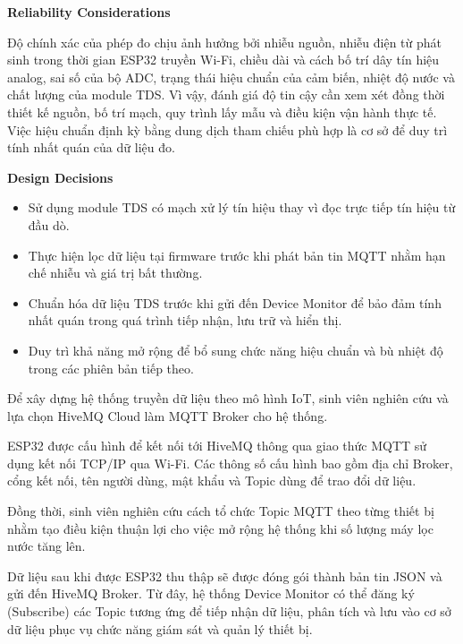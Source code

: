 \textbf{Reliability Considerations}

Độ chính xác của phép đo chịu ảnh hưởng bởi nhiễu nguồn, nhiễu điện từ phát sinh trong thời gian ESP32 truyền Wi-Fi, chiều dài và cách bố trí dây tín hiệu analog, sai số của bộ ADC, trạng thái hiệu chuẩn của cảm biến, nhiệt độ nước và chất lượng của module TDS. Vì vậy, đánh giá độ tin cậy cần xem xét đồng thời thiết kế nguồn, bố trí mạch, quy trình lấy mẫu và điều kiện vận hành thực tế. Việc hiệu chuẩn định kỳ bằng dung dịch tham chiếu phù hợp là cơ sở để duy trì tính nhất quán của dữ liệu đo.

\textbf{Design Decisions}

\begin{itemize}
    \item Sử dụng module TDS có mạch xử lý tín hiệu thay vì đọc trực tiếp tín hiệu từ đầu dò.
    \item Thực hiện lọc dữ liệu tại firmware trước khi phát bản tin MQTT nhằm hạn chế nhiễu và giá trị bất thường.
    \item Chuẩn hóa dữ liệu TDS trước khi gửi đến Device Monitor để bảo đảm tính nhất quán trong quá trình tiếp nhận, lưu trữ và hiển thị.
    \item Duy trì khả năng mở rộng để bổ sung chức năng hiệu chuẩn và bù nhiệt độ trong các phiên bản tiếp theo.
\end{itemize}

\vspace{0.5em}


Để xây dựng hệ thống truyền dữ liệu theo mô hình IoT, sinh viên nghiên cứu và lựa chọn HiveMQ Cloud làm MQTT Broker cho hệ thống.

ESP32 được cấu hình để kết nối tới HiveMQ thông qua giao thức MQTT sử dụng kết nối TCP/IP qua Wi-Fi. Các thông số cấu hình bao gồm địa chỉ Broker, cổng kết nối, tên người dùng, mật khẩu và Topic dùng để trao đổi dữ liệu.

Đồng thời, sinh viên nghiên cứu cách tổ chức Topic MQTT theo từng thiết bị nhằm tạo điều kiện thuận lợi cho việc mở rộng hệ thống khi số lượng máy lọc nước tăng lên.

Dữ liệu sau khi được ESP32 thu thập sẽ được đóng gói thành bản tin JSON và gửi đến HiveMQ Broker. Từ đây, hệ thống Device Monitor có thể đăng ký (Subscribe) các Topic tương ứng để tiếp nhận dữ liệu, phân tích và lưu vào cơ sở dữ liệu phục vụ chức năng giám sát và quản lý thiết bị.

